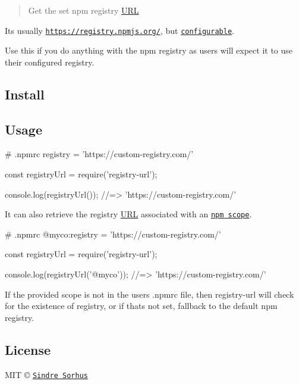 \begin{quote}
Get the set npm registry \mbox{\hyperlink{namespace_u_r_l}{U\+RL}} \end{quote}


It\textquotesingle{}s usually {\ttfamily \href{https://registry.npmjs.org/}{\tt https\+://registry.\+npmjs.\+org/}}, but \href{https://www.npmjs.org/doc/misc/npm-config.html#registry}{\tt configurable}.

Use this if you do anything with the npm registry as users will expect it to use their configured registry.

\subsection*{Install}




\subsection*{Usage}


\begin{DoxyCode}
# .npmrc
registry = 'https://custom-registry.com/'
\end{DoxyCode}



\begin{DoxyCode}
const registryUrl = require('registry-url');

console.log(registryUrl());
//=> 'https://custom-registry.com/'
\end{DoxyCode}


It can also retrieve the registry \mbox{\hyperlink{namespace_u_r_l}{U\+RL}} associated with an \href{https://docs.npmjs.com/misc/scope}{\tt npm scope}.


\begin{DoxyCode}
# .npmrc
@myco:registry = 'https://custom-registry.com/'
\end{DoxyCode}



\begin{DoxyCode}
const registryUrl = require('registry-url');

console.log(registryUrl('@myco'));
//=> 'https://custom-registry.com/'
\end{DoxyCode}


If the provided scope is not in the user\textquotesingle{}s {\ttfamily .npmrc} file, then {\ttfamily registry-\/url} will check for the existence of {\ttfamily registry}, or if that\textquotesingle{}s not set, fallback to the default npm registry.

\subsection*{License}

M\+IT © \href{http://sindresorhus.com}{\tt Sindre Sorhus} 